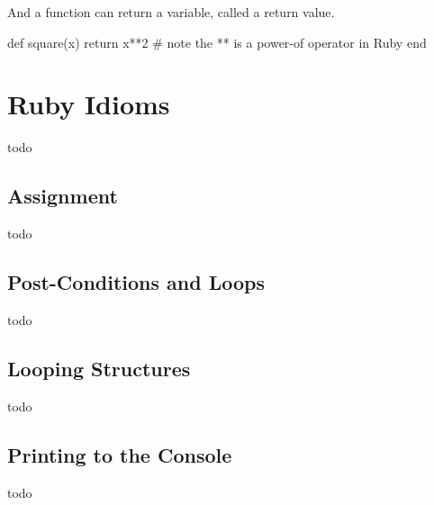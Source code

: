And a function can return a variable, called a return value.

def square(x)
	return x**2 # note the ** is a power-of operator in Ruby
end

\section*{Ruby Idioms}
todo

\subsection{Assignment}
todo

\subsection{Post-Conditions and Loops}
todo

\subsection{Looping Structures}
todo

\subsection{Printing to the Console}
todo


